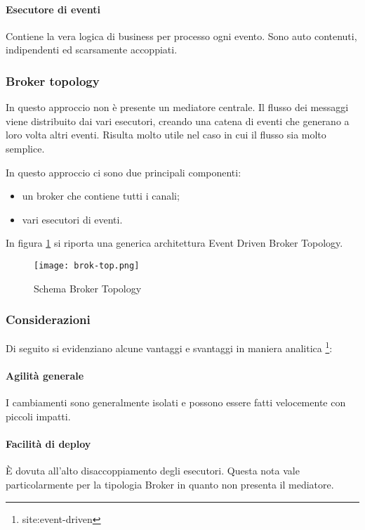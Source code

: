\paragraph{Esecutore di eventi}
Contiene la vera logica di business per processo ogni evento. Sono auto contenuti, indipendenti ed scarsamente accoppiati.



\subsubsection{Broker topology}
In questo approccio non è presente un mediatore centrale. Il flusso dei messaggi viene distribuito dai vari esecutori, creando una catena di eventi che generano a loro volta altri eventi. Risulta molto utile nel caso in cui il flusso sia molto semplice. 

In questo approccio ci sono due principali componenti:
\begin{itemize}
    \item un broker che contiene tutti i canali;
    \item vari esecutori di eventi.
\end{itemize}
    
In figura \ref{fig:eventdriven-bro-top} si riporta una generica architettura Event Driven Broker Topology.

\begin{figure}[htbp]
    \centering
    \texttt{[image: brok-top.png]} 
    \caption{Schema Broker Topology}
    \label{fig:eventdriven-bro-top} 
\end{figure}

\subsubsection{Considerazioni}
Di seguito si evidenziano alcune vantaggi e svantaggi in maniera analitica \footnote{site:event-driven}:
\paragraph{Agilità generale}
I cambiamenti sono generalmente isolati e possono essere fatti velocemente con piccoli impatti.
\paragraph{Facilità di deploy}
È dovuta all’alto disaccoppiamento degli esecutori. Questa nota vale particolarmente per la tipologia Broker in quanto non presenta il mediatore.
